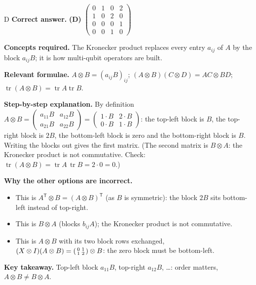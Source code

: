 \documentclass[11pt,a4paper]{article}
\newcommand{\qsep}{\par\vspace{2pt}{\color{black!15}\hrule}\vspace{4pt}}
\begin{document}
\begin{solbox}{D}
\textbf{\color{brand}Correct answer.} \textcolor{okgreen}{\textbf{(D)}} $\begin{pmatrix}0&1&0&2\\1&0&2&0\\0&0&0&1\\0&0&1&0\end{pmatrix}$

\textbf{\color{brand}Concepts required.} The Kronecker product replaces every entry $a_{ij}$ of $A$ by the block $a_{ij}B$; it is how multi-qubit operators are built.

\textbf{\color{brand}Relevant formulae.} $A\otimes B = (a_{ij}B)_{ij}$; $(A\otimes B)(C\otimes D) = AC\otimes BD$; $\operatorname{tr}(A\otimes B) = \operatorname{tr}A\operatorname{tr}B$.

\textbf{\color{brand}Step-by-step explanation.} By definition $A \otimes B = \begin{pmatrix} a_{11}B & a_{12}B\\ a_{21}B & a_{22}B\end{pmatrix}
= \begin{pmatrix} 1\cdot B & 2\cdot B\\ 0\cdot B & 1\cdot B\end{pmatrix}$: the top-left block is $B$, the top-right block is $2B$,
the bottom-left block is zero and the bottom-right block is $B$. Writing the blocks out gives the first matrix.
(The second matrix is $B \otimes A$: the Kronecker product is not commutative. Check: $\operatorname{tr}(A\otimes B) = \operatorname{tr}A\,\operatorname{tr}B = 2\cdot 0 = 0$.)

\textbf{\color{brand}Why the other options are incorrect.}
\begin{itemize}[leftmargin=2.4em, itemsep=1pt, topsep=2pt]
\item[\textbf{(A)}] This is $A^{\mathsf T}\otimes B = (A\otimes B)^{\mathsf T}$ (as $B$ is symmetric): the block $2B$ sits bottom-left instead of top-right.
\item[\textbf{(B)}] This is $B\otimes A$ (blocks $b_{ij}A$); the Kronecker product is not commutative.
\item[\textbf{(C)}] This is $A\otimes B$ with its two block rows exchanged, $(X\otimes I)(A\otimes B) = \begin{psmallmatrix}0&1\\1&2\end{psmallmatrix}\otimes B$: the zero block must be bottom-left.
\end{itemize}
\textbf{\color{brand}Key takeaway.} Top-left block $a_{11}B$, top-right $a_{12}B$, \dots: order matters, $A\otimes B \neq B\otimes A$.
\end{solbox}
\qsep
\end{document}
